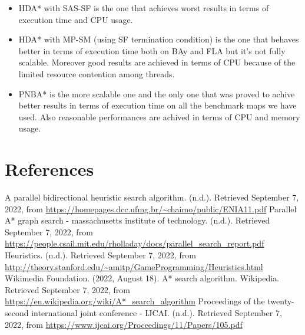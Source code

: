 \documentclass[12pt]{beamer}
\begin{document}
	\begin{frame}{\secname}
		\begin{itemize}
			\item HDA* with SAS-SF is the one that achieves worst results in terms of execution time and CPU usage.
			\item HDA* with MP-SM (using SF termination condition) is the one that behaves better in terms of execution
				  time both on BAy and FLA but it's not fully scalable. Moreover good results are achieved in terms of
				  CPU because of the limited resource contention among threads.
			\item PNBA* is the more scalable one and the only one that was proved to achive better results in terms of
				  execution time on all the benchmark maps we have used. Also reasonable performances are achived in terms
				  of CPU and memory usage.
		  \end{itemize}
	\end{frame}
	\section{References}
	\begin{frame}[allowframebreaks]{\secname}
		\begin{thebibliography}{9}
			 A parallel bidirectional heuristic search algorithm. (n.d.). Retrieved September 7, 2022, 
			from \url{https://homepages.dcc.ufmg.br/~chaimo/public/ENIA11.pdf}
			 Parallel A* graph search - massachusetts institute of technology. (n.d.). Retrieved September 7, 2022, from 
			\url{https://people.csail.mit.edu/rholladay/docs/parallel_search_report.pdf}
			Heuristics. (n.d.). Retrieved September 7, 2022, from 
			\url{http://theory.stanford.edu/~amitp/GameProgramming/Heuristics.html}
			Wikimedia Foundation. (2022, August 18). A* search algorithm. Wikipedia. Retrieved September 7, 2022, 
			from \url{https://en.wikipedia.org/wiki/A*_search_algorithm}
			Proceedings of the twenty-second international joint conference - IJCAI. (n.d.). Retrieved September 7, 2022, 
			from \url{https://www.ijcai.org/Proceedings/11/Papers/105.pdf}
		  \end{thebibliography}
	\end{frame}
\end{document}
